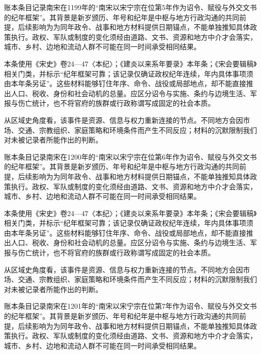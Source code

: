 账本条目记录南宋在1199年的“南宋以宋宁宗在位第5年作为诏令、赋役与外交文书的纪年框架”。其背景是新岁颁历、年号和纪年是中枢与地方行政沟通的共同前提，后续影响为为同年政令、战事和地方材料提供日期锚点，不能单独推知具体政策执行。政权、军队或制度的变化须经由道路、文书、资源和地方中介才会落实，城市、乡村、边地和流动人群不可能在同一时间承受相同结果。

本条使用《宋史》卷24—47〈本纪〉；《建炎以来系年要录》本年条；《宋会要辑稿》相关门类，并标示“纪年框架可靠；该记录仅确证政权纪年连续，年内具体事项须由本年条另证”。这些材料能够钉住年序、命令、战役或局部地点，却不能直接推出人口、税收、身份和社会动机的总量。应区分诏令与实施、条约与边境生活、军报与伤亡统计，也不将官府的族群或行政称谓写成固定的社会本质。

从区域史角度看，该事件是资源、信息与权力重新连接的节点。不同地方会因市场、交通、宗教组织、家庭策略和环境条件而产生不同反应；材料的沉默限制我们对未被记录者所能作出的判断。

账本条目记录南宋在1200年的“南宋以宋宁宗在位第6年作为诏令、赋役与外交文书的纪年框架”。其背景是新岁颁历、年号和纪年是中枢与地方行政沟通的共同前提，后续影响为为同年政令、战事和地方材料提供日期锚点，不能单独推知具体政策执行。政权、军队或制度的变化须经由道路、文书、资源和地方中介才会落实，城市、乡村、边地和流动人群不可能在同一时间承受相同结果。

本条使用《宋史》卷24—47〈本纪〉；《建炎以来系年要录》本年条；《宋会要辑稿》相关门类，并标示“纪年框架可靠；该记录仅确证政权纪年连续，年内具体事项须由本年条另证”。这些材料能够钉住年序、命令、战役或局部地点，却不能直接推出人口、税收、身份和社会动机的总量。应区分诏令与实施、条约与边境生活、军报与伤亡统计，也不将官府的族群或行政称谓写成固定的社会本质。

从区域史角度看，该事件是资源、信息与权力重新连接的节点。不同地方会因市场、交通、宗教组织、家庭策略和环境条件而产生不同反应；材料的沉默限制我们对未被记录者所能作出的判断。

账本条目记录南宋在1201年的“南宋以宋宁宗在位第7年作为诏令、赋役与外交文书的纪年框架”。其背景是新岁颁历、年号和纪年是中枢与地方行政沟通的共同前提，后续影响为为同年政令、战事和地方材料提供日期锚点，不能单独推知具体政策执行。政权、军队或制度的变化须经由道路、文书、资源和地方中介才会落实，城市、乡村、边地和流动人群不可能在同一时间承受相同结果。

